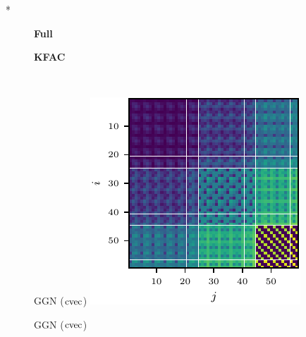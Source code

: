 \switchcolumn[1]*
\begin{figure}[!h]
  \centering
  \begin{minipage}[t]{0.485\linewidth}
    \centering
    \textbf{Full}
  \end{minipage}
  \hfill
  \begin{minipage}[t]{0.485\linewidth}
    \centering
    \textbf{KFAC}
  \end{minipage}
  \\
  \begin{minipage}[t]{0.485\linewidth}
    \centering
    GGN ($\operatorname{cvec}$)\vspace{1ex}
    \includegraphics[width=1.0\linewidth]{../kfs/plots/synthetic_cvec_ggn_full.pdf}
  \end{minipage}
  \hfill
  \begin{minipage}[t]{0.485\linewidth}
    \centering
    GGN ($\operatorname{cvec}$)\vspace{1ex}

\end{minipage}
\end{figure}

